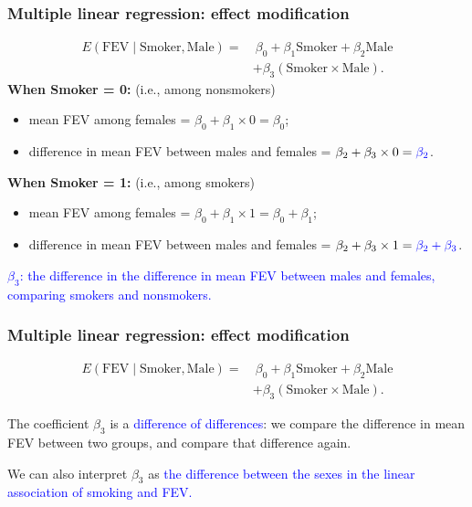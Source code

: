 \documentclass[12pt, 
hyperref={colorlinks=true, linkcolor=blue, urlcolor=cyan},dvipsnames]{beamer}
\begin{document}
\begin{frame}
\frametitle{Multiple linear regression: effect modification}
\vspace{-0.7cm}
\begin{align*}
E(\text{FEV} \mid \text{Smoker}, \text{Male}) = & \ \beta_0 + \beta_1 \text{Smoker} + \beta_2 \text{Male}\\
& + \beta_3 (\text{Smoker} \times \text{Male}).
\end{align*}
\vspace{-0.3cm}
\textbf{When Smoker = 0:}  (i.e., among nonsmokers) \vspace{-0.2cm}
\begin{itemize}
\item mean FEV among females = $\beta_0 + \beta_1 \times 0 = \beta_0$; 
\item difference in mean FEV between males and females = $\beta_2 + \beta_3 \times 0 = \color{blue}{\beta_2}$.
\end{itemize}

\textbf{When Smoker = 1:}  (i.e., among smokers) \vspace{-0.2cm}
\begin{itemize}
\item mean FEV among females = $\beta_0 + \beta_1 \times 1 = \beta_0 + \beta_1$; 
\item difference in mean FEV between males and females = $\beta_2 + \beta_3 \times 1 = \color{blue}{\beta_2 + \beta_3}$.
\end{itemize}

\textcolor{blue}{$\beta_3$: the difference in the difference in mean FEV between males and females, comparing smokers and nonsmokers.}
\end{frame}

\begin{frame}
\frametitle{Multiple linear regression: effect modification}
\begin{align*}
E(\text{FEV} \mid \text{Smoker}, \text{Male}) = & \ \beta_0 + \beta_1 \text{Smoker} + \beta_2 \text{Male}\\
& + \beta_3 (\text{Smoker} \times \text{Male}).
\end{align*}

The coefficient $\beta_3$ is a \textcolor{blue}{difference of differences}: we compare the difference in mean FEV between two groups, and compare that difference again.

We can also interpret $\beta_3$ as \textcolor{blue}{the difference between the sexes in the linear association of smoking and FEV.}

\end{frame}
\end{document}
